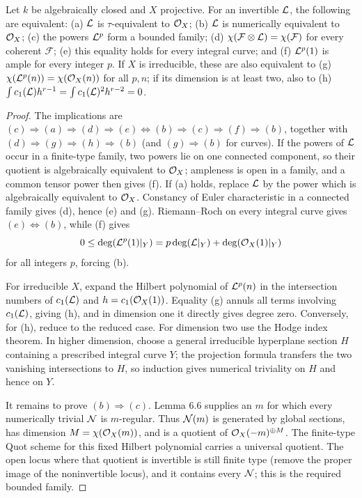 \begin{theorem}\label{kps-thm-numerical}
Let $k$ be algebraically closed and $X$ projective. For an invertible $\mathcal L$,
the following are equivalent: (a) $\mathcal L$ is $\tau$-equivalent to $\mathcal O_X$;
(b) $\mathcal L$ is numerically equivalent to $\mathcal O_X$; (c) the powers $\mathcal L^p$ form a
bounded family; (d) $\chi(\mathcal F\otimes\mathcal L)=\chi(\mathcal F)$ for every coherent
$\mathcal F$; (e) this equality holds for every integral curve; and (f)
$\mathcal L^p(1)$ is ample for every integer $p$. If $X$ is irreducible, these are
also equivalent to (g) $\chi(\mathcal L^p(n))=\chi(\mathcal O_X(n))$ for all $p,n$; if its
dimension is at least two, also to (h)
$\int c_1(\mathcal L)h^{r-1}=\int c_1(\mathcal L)^2h^{r-2}=0$.
\end{theorem}
\begin{proof}
The implications are
$(c)\Rightarrow(a)\Rightarrow(d)\Rightarrow(e)\Longleftrightarrow(b)
\Rightarrow(c)\Rightarrow(f)\Rightarrow(b)$, together with
$(d)\Rightarrow(g)\Rightarrow(h)\Rightarrow(b)$ (and
$(g)\Rightarrow(b)$ for curves). If the powers of $\mathcal L$ occur in a finite-type
family, two powers lie on one connected component, so their quotient is
algebraically equivalent to $\mathcal O_X$; ampleness is open in a family, and a
common tensor power then gives (f). If (a) holds, replace $\mathcal L$ by the power
which is algebraically equivalent to $\mathcal O_X$. Constancy of Euler characteristic
in a connected family gives (d), hence (e) and (g). Riemann--Roch on every
integral curve gives $(e)\Longleftrightarrow(b)$, while (f) gives
\[
  0\le\deg(\mathcal L^p(1)|_Y)=p\deg(\mathcal L|_Y)+\deg(\mathcal O_X(1)|_Y)
\]
for all integers $p$, forcing (b).

For irreducible $X$, expand the Hilbert polynomial of $\mathcal L^p(n)$ in the
intersection numbers of $c_1(\mathcal L)$ and $h=c_1(\mathcal O_X(1))$. Equality (g)
annuls all terms involving $c_1(\mathcal L)$, giving (h), and in dimension one it
directly gives degree zero. Conversely, for (h), reduce to the reduced case.
For dimension two use the Hodge index theorem. In higher dimension, choose a
general irreducible hyperplane section $H$ containing a prescribed integral
curve $Y$; the projection formula transfers the two vanishing intersections to
$H$, so induction gives numerical triviality on $H$ and hence on $Y$.

It remains to prove $(b)\Rightarrow(c)$. Lemma 6.6 supplies an $m$ for which
every numerically trivial $\mathcal N$ is $m$-regular. Thus $\mathcal N(m)$ is generated by
global sections, has dimension $M=\chi(\mathcal O_X(m))$, and is a quotient of
$\mathcal O_X(-m)^{\oplus M}$. The finite-type Quot scheme for this fixed Hilbert
polynomial carries a universal quotient. The open locus where that quotient is
invertible is still finite type (remove the proper image of the noninvertible
locus), and it contains every $\mathcal N$; this is the required bounded family.
\end{proof}

